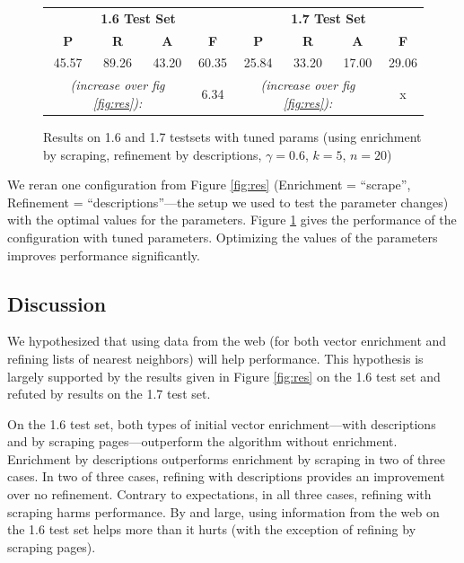 \documentclass{article}
\begin{document}
\begin{figure}[htbp]
\begin{center}
\begin{tabular}{|c|c|c|c||c|c|c|c|}
\hline
  \multicolumn{4}{|c||}{{\bf 1.6 Test Set}} & \multicolumn{4}{c|}{{\bf 1.7 Test Set}}  \\
  {\bf P} & {\bf R} & {\bf A} & {\bf F} & {\bf P} & {\bf R} & {\bf A} & {\bf F} \\
\hline \hline
45.57 & 89.26 & 43.20 & 60.35 & 25.84 & 33.20 & 17.00 & 29.06 \\
\hline
\multicolumn{3}{|c|}{{\it (increase over fig \ref{fig:res}):}} & 6.34 & \multicolumn{3}{c|}{{\it (increase over fig \ref{fig:res}):}}  & x  \\
\hline
\end{tabular}
\caption{Results on 1.6 and 1.7 testsets with tuned params (using enrichment by scraping, refinement by descriptions, $\gamma=0.6$, $k=5$, $n=20$)}
\label{fig:tunedres}
\end{center}
\end{figure}
We  reran one configuration from Figure \ref{fig:res} (Enrichment = ``scrape'', Refinement = ``descriptions''---the setup we used to test the parameter changes) with the optimal values for the parameters.
Figure \ref{fig:tunedres} gives the performance of the configuration with tuned parameters.
Optimizing the values of the parameters improves performance significantly.


\subsection{Discussion}


We hypothesized that using data from the web (for both vector enrichment and refining lists of nearest neighbors) will help performance.
This hypothesis is largely supported by the results given in Figure \ref{fig:res} on the 1.6 test set and refuted by results on the 1.7 test set.

On the 1.6 test set, both types of initial vector enrichment---with descriptions and by scraping pages---outperform the algorithm without enrichment.
Enrichment by descriptions outperforms enrichment by scraping in two of three cases.
In two of three cases, refining with descriptions provides an improvement over no refinement.
Contrary to expectations, in all three cases, refining with scraping harms performance.
By and large, using information from the web on the 1.6 test set helps more than it hurts (with the exception of refining by scraping pages).
\end{document}
